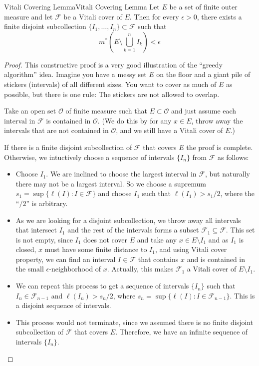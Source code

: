 \documentclass[../main.tex]{subfiles}
\begin{document}
\begin{lemma}{Vitali Covering Lemma}{Vitali Covering Lemma}
  Let $E$ be a set of finite outer measure and let $\mathcal{F}$ be a Vitali cover of $E$. Then for every $\epsilon > 0$, there exists a finite disjoint subcollection $\{I_1, \ldots, I_n\} \subset \mathcal{F}$ such that
  \begin{equation}
    m^*\left(E \setminus \bigcup_{k=1}^{n} I_k\right) < \epsilon
  \end{equation}
\end{lemma}
\begin{proof}
  This constructive proof is a very good illustration of the ``greedy algorithm'' idea. Imagine you have a messy set $E$ on the floor and a giant pile of stickers (intervals) of all different sizes. You want to cover as much of $E$ as possible, but there is one rule: The stickers are not allowed to overlap.

  Take an open set $\mathcal{O}$ of finite measure such that $E \subset \mathcal{O}$ and just assume each interval in $\mathcal{F}$ is contained in $\mathcal{O}$. (We do this by for any $x\in E$, throw away the intervals that are not contained in $\mathcal{O}$, and we still have a Vitali cover of $E$.)

  If there is a finite disjoint subcollection of $\mathcal{F}$ that covers $E$ the proof is complete. Otherwise, we intuctively choose a sequence of intervals $\{I_n\}$ from $\mathcal{F}$ as follows:
  \begin{itemize}
    \item Choose $I_1$. We are inclined to choose the largest interval in $\mathcal{F}$, but naturally there may not be a largest interval. So we choose a supremum $s_1 = \sup\{\ell(I): I \in \mathcal{F}\}$ and choose $I_1$ such that $\ell(I_1) > s_1/2$, where the ``$/2$'' is arbitrary.
    \item As we are looking for a disjoint subcollection, we throw away all intervals that intersect $I_1$ and the rest of the intervals forms a subset $\mathcal{F}_1 \subseteq \mathcal{F}$. This set is not empty, since $I_1$ does not cover $E$ and take any $x \in E \setminus I_1$ and as $I_1$ is closed, $x$ must have some finite distance to $I_1$, and using Vitali cover property, we can find an interval $I \in \mathcal{F}$ that contains $x$ and is contained in the small $\epsilon$-neighborhood of $x$. Actually, this makes $\mathcal{F}_1$ a Vitali cover of $E \setminus I_1$.
    \item We can repeat this process to get a sequence of intervals $\{I_n\}$ such that $I_n \in \mathcal{F}_{n-1}$ and $\ell(I_n) > s_n/2$, where $s_n = \sup\{\ell(I): I \in \mathcal{F}_{n-1}\}$. This is a disjoint sequence of intervals.
    \item This process would not terminate, since we assumed there is no finite disjoint subcollection of $\mathcal{F}$ that covers $E$. Therefore, we have an infinite sequence of intervals $\{I_n\}$.
  \end{itemize}


\end{proof}
\end{document}
